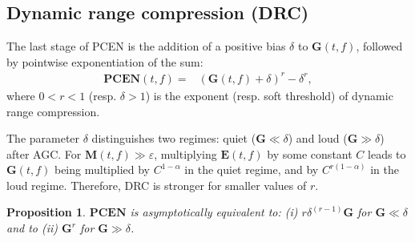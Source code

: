 \documentclass[journal]{IEEEtran}
\makeatletter
\newcommand*{\resp}{resp.\@\xspace}
\newtheorem{prop}[thm]{Proposition}
\theoremstyle{remark}
\makeatother
\begin{document}
\subsection{Dynamic range compression (DRC)}
The last stage of PCEN is the addition of a positive bias $\delta$ to $\mathbf{G}(t,f)$, followed by pointwise exponentiation of the sum:
\begin{align}
\mathbf{PCEN}(t,f) = &
(\mathbf{G}(t,f) + \delta)^r - \delta^r,
\end{align}
where $0 < r < 1$ (\resp{} $\delta > 1$) is the exponent (\resp{} soft threshold) of dynamic range compression.

The parameter $\delta$ distinguishes two regimes: quiet ($\mathbf{G}\ll\delta$) and loud ($\mathbf{G}\gg\delta$) after AGC.
For $\mathbf{M}(t,f)\gg\varepsilon$, multiplying $\mathbf{E}(t,f)$ by some constant $C$ leads to $\mathbf{G}(t,f)$ being multiplied by $C^{1-\alpha}$ in the quiet regime, and by $C^{r(1-\alpha)}$ in the loud regime.
Therefore, DRC is stronger for smaller values of $r$.

\begin{prop}
$\mathbf{PCEN}$ is asymptotically equivalent to: (i) $r \delta^{(r-1)} \mathbf{G}$ for $\mathbf{G} \ll \delta$ and to (ii) $\mathbf{G}^r$ for $\mathbf{G} \gg \delta$.
\label{prop:loudness-compression}
\end{prop}
\end{document}
